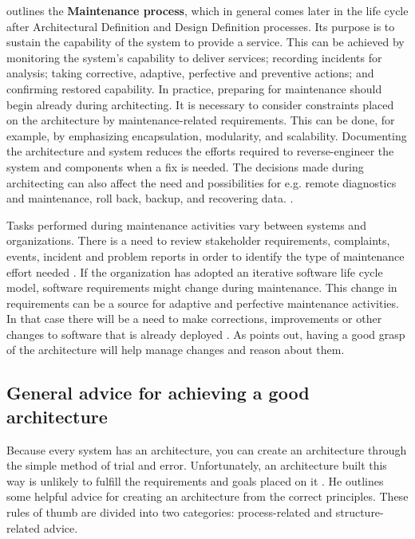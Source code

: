 \documentclass[utf8,english]{gradu3}
\begin{document}
\textcite{IEEE12207} outlines the \textbf{Maintenance process}, which in general comes later in the
life cycle after Architectural Definition and Design Definition processes. Its
purpose is to sustain the capability of the system to provide a service. This
can be achieved by monitoring the system's capability to deliver services;
recording incidents for analysis; taking corrective, adaptive, perfective and
preventive actions; and confirming restored capability. In practice, preparing
for maintenance should begin already during architecting. It is necessary to
consider constraints placed on the architecture by maintenance-related
requirements. This can be done, for example, by emphasizing encapsulation,
modularity, and scalability. Documenting the architecture and system reduces the
efforts required to reverse-engineer the system and components when a fix is
needed. The decisions made during architecting can also affect the need and
possibilities for e.g. remote diagnostics and maintenance, roll back, backup,
and recovering data. \parencite[95-96]{IEEE12207}.

Tasks performed during maintenance activities vary between systems and
organizations. There is a need to review stakeholder requirements, complaints,
events, incident and problem reports in order to identify the type of
maintenance effort needed \parencite{IEEE12207}. If the organization has adopted an
iterative software life cycle model, software requirements might change during
maintenance. This change in requirements can be a source for adaptive and
perfective maintenance activities. In that case there will be a need to make
corrections, improvements or other changes to software that is already deployed
\parencite[97]{IEEE12207}. As \textcite[32]{Bass1998} points out, having a good grasp of the
architecture will help manage changes and reason about them.


\subsection{General advice for achieving a good architecture}

Because every system has an architecture, you can create an architecture through
the simple method of trial and error. Unfortunately, an architecture built this
way is unlikely to fulfill the requirements and goals placed on it \parencite[24]{Bass1998}.
He outlines some helpful advice for creating an architecture from the
correct principles. These rules of thumb are divided into two categories:
process-related and structure-related advice.
\end{document}
